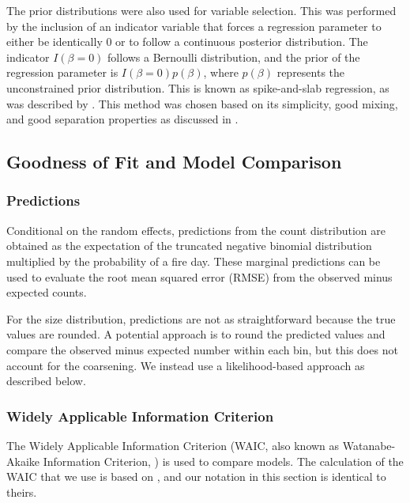 \documentclass[10pt,letterpaper]{article}
\begin{document}
The prior distributions were also used for variable selection. This was
performed by the inclusion of an indicator variable that forces a regression
parameter to either be identically 0 or to follow a continuous posterior
distribution. The indicator \(I(\beta = 0)\) follows a Bernoulli
distribution, and the prior of the regression parameter is
\(I(\beta = 0)p(\beta)\), where \(p(\beta)\) represents the
unconstrained prior distribution. This is known as spike-and-slab
regression, as was described by
\cite{kuoVariableSelectionRegression1998}. This method was chosen based
on its simplicity, good mixing, and good separation properties as
discussed in \cite{oharaReviewBayesianVariable2009}.

\hypertarget{goodness-of-fit-and-model-comparison}{%
\subsection{Goodness of Fit and Model
Comparison}\label{goodness-of-fit-and-model-comparison}}

\hypertarget{predictions}{%
\subsubsection{Predictions}\label{predictions}}

Conditional on the random effects, predictions from the count
distribution are obtained as the expectation of the truncated negative binomial
distribution multiplied by the probability of a fire day. These marginal
predictions can be used to evaluate the root mean squared error (RMSE)
from the observed minus expected counts.

For the size distribution, predictions are not as straightforward
because the true values are rounded. A potential approach is to round
the predicted values and compare the observed minus expected number
within each bin, but this does not account for the coarsening. We
instead use a likelihood-based approach as described below.

\hypertarget{widely-applicable-information-criterion}{%
\subsubsection{Widely Applicable Information
Criterion}\label{widely-applicable-information-criterion}}

The Widely Applicable Information Criterion
(WAIC, also known as
Watanabe-Akaike Information Criterion, \cite{watanabeAsymptoticEquivalenceBayes2010,watanabeEquationsStatesSingular2010}) is used to compare models.
The calculation of the WAIC that we use is based on
\cite{gelmanUnderstandingPredictiveInformation2014a}, and our notation
in this section is identical to theirs.
\end{document}
